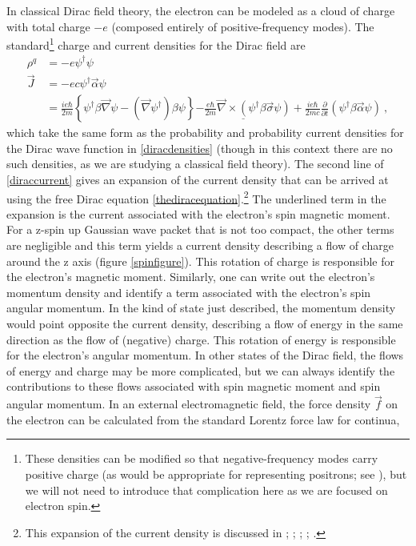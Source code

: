 \documentclass[onecolumn,secnumarabic,amsmath,amssymb,balancelastpage,nofootinbib,12pt]{article}
\begin{document}
In classical Dirac field theory, the electron can be modeled as a cloud of charge with total charge $-e$ (composed entirely of positive-frequency modes).  The standard\footnote{These densities can be modified so that negative-frequency modes carry positive charge (as would be appropriate for representing positrons; see \citealp{positrons}), but we will not need to introduce that complication here as we are focused on electron spin.} charge and current densities for the Dirac field are
\begin{align}
\rho^q&=-e \psi^{\dagger}\psi
\label{diraccharge}
\\
\vec{J}&=-ec \psi^{\dagger}\vec{\alpha}\psi
\nonumber
\\
&=\frac{i e\hbar}{2 m}\left\{\psi^\dagger \beta \vec{\nabla} \psi - (\vec{\nabla} \psi^\dagger) \beta\psi\right\}\underline{ - \frac{e\hbar}{2 m} \vec{\nabla}\times(\psi^\dagger \beta \vec{\sigma}\psi)}+\frac{i e\hbar}{2 m c}\frac{\partial}{\partial t}(\psi^\dagger \beta\vec{\alpha} \psi)
\ ,
\label{diraccurrent}
\end{align}
which take the same form as the probability and probability current densities for the Dirac wave function in \eqref{diracdensities} (though in this context there are no such densities, as we are studying a classical field theory).  The second line of \eqref{diraccurrent} gives an expansion of the current density that can be arrived at using the free Dirac equation \eqref{thediracequation}.\footnote{This expansion of the current density is discussed in \citet{gordon1928}; \citet[pg.\ 321--322]{frenkel}; \citet[pg.\ 479]{huang1952}; \citet{ohanian}; \citet{howelectronsspin, smallelectronstates}.}  The underlined term in the expansion is the current associated with the electron's spin magnetic moment.  For a z-spin up Gaussian wave packet that is not too compact, the other terms are negligible and this term yields a current density describing a flow of charge around the z axis (figure \ref{spinfigure}).  This rotation of charge is responsible for the electron's magnetic moment.  Similarly, one can write out the electron's momentum density and identify a term associated with the electron's spin angular momentum.  In the kind of state just described, the momentum density would point opposite the current density, describing a flow of energy in the same direction as the flow of (negative) charge.  This rotation of energy is responsible for the electron's angular momentum.  In other states of the Dirac field, the flows of energy and charge may be more complicated, but we can always identify the contributions to these flows associated with spin magnetic moment and spin angular momentum.  In an external electromagnetic field, the force density $\vec{f}$ on the electron can be calculated from the standard Lorentz force law for continua,
\end{document}
